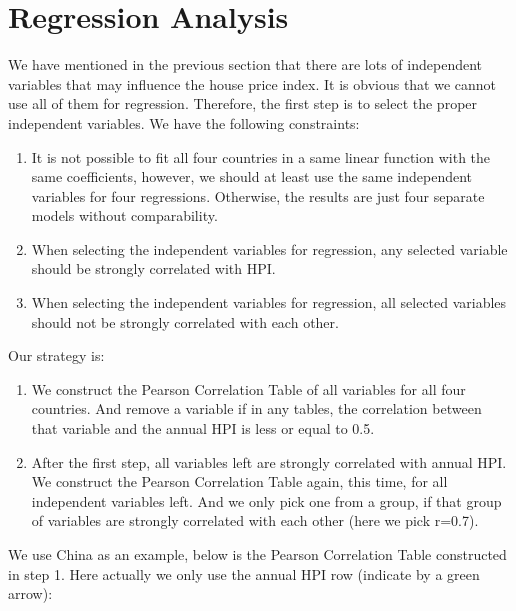 \documentclass[11pt]{article}
\begin{document}
\section{Regression Analysis}\label{regression_analysis}
We have mentioned in the previous section that there are lots of independent variables that may influence the house price index. It is obvious that we cannot use all of them for regression. Therefore, the first step is to select the proper independent variables. We have the following constraints:
\begin{enumerate}
    \item It is not possible to fit all four countries in a same linear function with the same coefficients, however, we should at least use the same independent variables for four regressions. Otherwise, the results are just four separate models without comparability.
    \item When selecting the independent variables for regression, any selected variable should be strongly correlated with HPI.
    \item When selecting the independent variables for regression, all selected variables should not be strongly correlated with each other.
\end{enumerate}
Our strategy is:
\begin{enumerate}
    \item We construct the Pearson Correlation Table of all variables for all four countries. And remove a variable if in any tables, the correlation between that variable and the annual HPI is less or equal to 0.5.
    \item After the first step, all variables left are strongly correlated with annual HPI. We construct the Pearson Correlation Table again, this time, for all independent variables left. And we only pick one from a group, if that group of variables are strongly correlated with each other (here we pick r=0.7). 
\end{enumerate}
We use China as an example, below is the Pearson Correlation Table constructed in step 1. Here actually we only use the annual HPI row (indicate by a green arrow):
\end{document}
